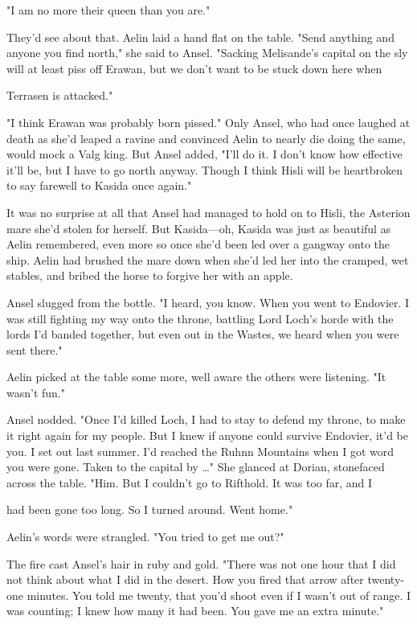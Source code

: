 "I am no more their queen than you are."

They'd see about that. Aelin laid a hand flat on the table. "Send anything and anyone you find north," she said to Ansel. "Sacking Melisande's capital on the sly will at least piss off Erawan, but we don't want to be stuck down here when

Terrasen is attacked."

"I think Erawan was probably born pissed." Only Ansel, who had once laughed at death as she'd leaped a ravine and convinced Aelin to nearly die doing the same, would mock a Valg king. But Ansel added, "I'll do it. I don't know how effective it'll be, but I have to go north anyway. Though I think Hisli will be heartbroken to say farewell to Kasida once again."

It was no surprise at all that Ansel had managed to hold on to Hisli, the Asterion mare she'd stolen for herself. But Kasida---oh, Kasida was just as beautiful as Aelin remembered, even more so once she'd been led over a gangway onto the ship. Aelin had brushed the mare down when she'd led her into the cramped, wet stables, and bribed the horse to forgive her with an apple.

Ansel slugged from the bottle. "I heard, you know. When you went to Endovier. I was still fighting my way onto the throne, battling Lord Loch's horde with the lords I'd banded together, but  even out in the Wastes, we heard when you were sent there."

Aelin picked at the table some more, well aware the others were listening. "It wasn't fun."

Ansel nodded. "Once I'd killed Loch, I had to stay to defend my throne, to make it right again for my people. But I knew if anyone could survive Endovier, it'd be you. I set out last summer. I'd reached the Ruhnn Mountains when I got word you were gone. Taken to the capital by
\ldots" She glanced at Dorian, stonefaced across the table. "Him. But I couldn't go to Rifthold. It was too far, and I

had been gone too long. So I turned around. Went home."

Aelin's words were strangled. "You tried to get me out?"

The fire cast Ansel's hair in ruby and gold. "There was not one hour that I did not think about what I did in the desert. How you fired that arrow after twenty-one minutes. You told me twenty, that you'd shoot even if I wasn't out of range. I was counting; I knew how many it had been. You gave me an extra minute."

